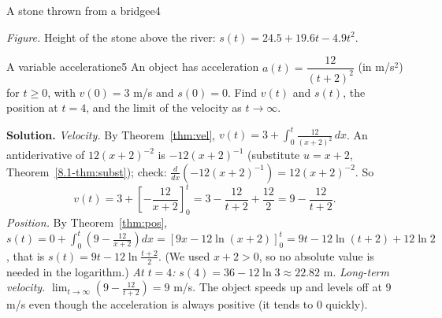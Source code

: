\documentclass[11pt]{article}
\begin{document}
\begin{exmp}{A stone thrown from a bridge}{e4}
\begin{center}
\par\small\emph{Figure.} Height of the stone above the river: $s(t)=24.5+19.6t-4.9t^2$.
\end{center}
\end{exmp}

\begin{exmp}{A variable acceleration}{e5}
An object has acceleration $a(t)=\dfrac{12}{(t+2)^2}$ (in m/s$^2$) for $t\ge0$, with $v(0)=3$ m/s and $s(0)=0$. Find $v(t)$ and $s(t)$, the position at $t=4$, and the limit of the velocity as $t\to\infty$.

\textbf{Solution.} \emph{Velocity.} By Theorem~\ref{thm:vel}, $v(t)=3+\int_0^t\frac{12}{(x+2)^2}\,dx$. An antiderivative of $12(x+2)^{-2}$ is $-12(x+2)^{-1}$ (substitute $u=x+2$, Theorem~\ref{8.1-thm:subst}); check: $\frac{d}{dx}\left(-12(x+2)^{-1}\right)=12(x+2)^{-2}$. So
\[
v(t)=3+\left[-\frac{12}{x+2}\right]_0^t=3-\frac{12}{t+2}+\frac{12}2=9-\frac{12}{t+2}.
\]
\emph{Position.} By Theorem~\ref{thm:pos}, $s(t)=0+\int_0^t\left(9-\frac{12}{x+2}\right)dx=\left[9x-12\ln(x+2)\right]_0^t=9t-12\ln(t+2)+12\ln2$, that is $s(t)=9t-12\ln\frac{t+2}2$. (We used $x+2>0$, so no absolute value is needed in the logarithm.)
\emph{At $t=4$:} $s(4)=36-12\ln3\approx22.82$ m.
\emph{Long-term velocity.} $\lim_{t\to\infty}\left(9-\frac{12}{t+2}\right)=9$ m/s. The object speeds up and levels off at $9$ m/s even though the acceleration is always positive (it tends to $0$ quickly).
\end{exmp}
\end{document}
